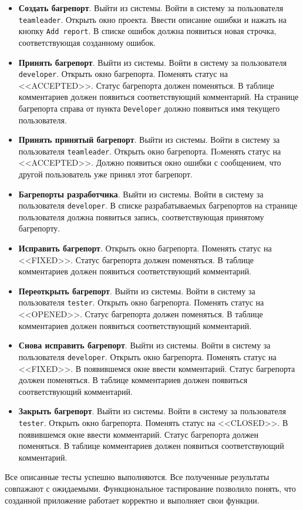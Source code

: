 \begin{itemize}
	\item \textbf{Создать багрепорт}. Выйти из системы. Войти в систему за пользователя \texttt{teamleader}. Открыть окно проекта. Ввести описание ошибки и нажать на кнопку \texttt{Add report}. В списке ошибок должна появиться новая строчка, соответствующая созданному ошибок.
	
	\item \textbf{Принять багрепорт}. Выйти из системы. Войти в систему за пользователя \texttt{developer}. Открыть окно багрепорта. Поменять статус на <<ACCEPTED>>. Статус багрепорта должен поменяться. В таблице комментариев должен появиться соответствующий комментарий. На странице багрепорта справа от пункта \texttt{Developer} должно появиться имя текущего пользователя.
	
	\item \textbf{Принять принятый багрепорт}. Выйти из системы. Войти в систему за пользователя \texttt{teamleader}. Открыть окно багрепорта. Пoменять статус на <<ACCEPTED>>. Должно появиться окно ошибки с сообщением, что другой пользователь уже принял этот багрепорт.
	
	\item \textbf{Багрепорты разработчика}. Выйти из системы. Войти в систему за пользователя \texttt{developer}. В списке разрабатываемых багрепортов на странице пользователя должна появиться запись, соответствующая принятому багрепорту.
	
	\item \textbf{Исправить багрепорт}. Открыть окно багрепорта. Поменять статус на <<FIXED>>. Статус багрепорта должен поменяться. В таблице комментариев должен появиться соответствующий комментарий.
	
	\item \textbf{Переоткрыть багрепорт}. Выйти из системы. Войти в систему за пользователя \texttt{tester}. Открыть окно багрепорта. Поменять статус на <<OPENED>>. Статус багрепорта должен поменяться. В таблице комментариев должен появиться соответствующий комментарий.
	
	\item \textbf{Снова исправить багрепорт}. Выйти из системы. Войти в систему за пользователя \texttt{developer}. Открыть окно багрепорта. Поменять статус на <<FIXED>>. В появившемся окне ввести комментарий. Статус багрепорта должен поменяться. В таблице комментариев должен появиться соответствующий комментарий.
	
	\item \textbf{Закрыть багрепорт}. Выйти из системы. Войти в систему за пользователя \texttt{tester}. Открыть окно багрепорта. Поменять статус на <<CLOSED>>. В появившемся окне ввести комментарий. Статус багрепорта должен поменяться. В таблице комментариев должен появиться соответствующий комментарий.
\end{itemize}

Все описанные тесты успешно выполняются. Все полученные результаты совпажают с ожидаемыми. Функциональное тастирование позволило понять, что созданной приложение работает корректно и выполняет свои функции.